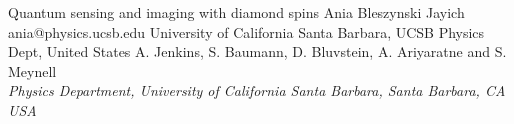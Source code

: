 \begin{conf-abstract}[]
{Quantum sensing and imaging with diamond spins}
{\color{blue} Ania Bleszynski Jayich}
{ania@physics.ucsb.edu}
{University of California Santa Barbara, UCSB Physics Dept, United States}
{{\color{blue}A. Jenkins, S. Baumann, D. Bluvstein, A. Ariyaratne and S. Meynell}\\ \textit{Physics Department, University of California Santa Barbara, Santa Barbara, CA USA}\\ 
\decofourleft \decofourright}





\printbibliography[heading=none]

\end{conf-abstract}
